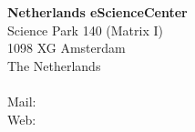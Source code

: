 

\setlength{\parindent}{0pt}
\setlength{\parskip}{1em}


\vspace{10cm} 
\textbf{Netherlands eScienceCenter} \\
Science Park 140 (Matrix I)\\
1098 XG Amsterdam\\
The Netherlands \\
 \\
Mail:  \\
Web:  \\
